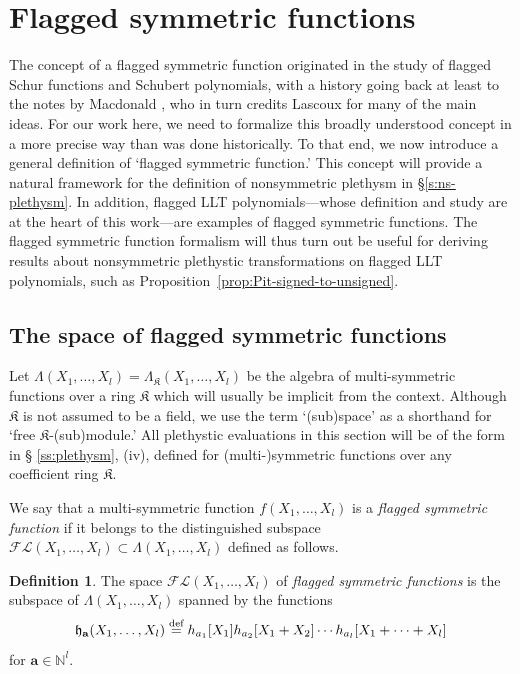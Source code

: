 \documentclass[12pt]{amsart}
\theoremstyle{definition}
\newtheorem{defn}[thm]{Definition}
\theoremstyle{remark}
\newcommand{\multisymmetric}{(multi\mbox{-})symmetric }
\newcommand{\NN}{{\mathbb N}}
\newcommand{\aA}{{\mathbf a}}
\newcommand{\fh}{{\mathfrak h}}
\newcommand{\Kfrak}{{\mathfrak K}}
\newcommand{\FLambda}{\mathcal{F\!L}}
\newcommand{\defeq}{\mathrel{\overset{\text{{\rm def}}}{=}}}
\begin{document}
\section{Flagged symmetric functions}
\label{s:flagged-symmetric-functions}

The concept of a flagged symmetric function originated in the study of
flagged Schur functions and Schubert polynomials, with a history going
back at least to the notes by Macdonald \cite{Macdonald91}, who in
turn credits Lascoux for many of the main ideas.  For our work here,
we need to formalize this broadly understood concept in a more precise
way than was done historically.  To that end, we now introduce a
general definition of `flagged symmetric function.'  This concept will
provide a natural framework for the definition of nonsymmetric
plethysm in \S \ref{s:ns-plethysm}.  In addition, flagged LLT
polynomials---whose definition and study are at the heart of this
work---are examples of flagged symmetric functions.  The flagged
symmetric function formalism will thus turn out be useful for deriving
results about nonsymmetric plethystic transformations on flagged LLT
polynomials, such as Proposition~\ref{prop:Pit-signed-to-unsigned}.


\subsection{The space of flagged symmetric functions}
\label{ss:flagged-sym}

Let $\Lambda (X_{1},\ldots,X_{l}) = \Lambda _{\Kfrak
}(X_{1},\ldots,X_{l}) $ be the algebra of multi-symmetric functions
over a ring $\Kfrak $ which will usually be implicit from the context.
Although $\Kfrak $ is not assumed to be a field, we use the term
`(sub)space' as a shorthand for `free $\Kfrak $-(sub)module.'  All
plethystic evaluations in this section will be of the form in \S
\ref{ss:plethysm}, (iv), defined for \multisymmetric functions over
any coefficient ring $\Kfrak $.


We say that a multi-symmetric function $f(X_{1},\ldots,X_{l})$ is a
{\em flagged symmetric function} if it belongs to the distinguished
subspace $\FLambda (X_{1},\ldots,X_{l}) \subset \Lambda
(X_{1},\ldots,X_{l})$ defined as follows.

\begin{defn}\label{def:flagged-sym}
The space $\FLambda(X_{1},\ldots,X_{l})$ of {\em flagged symmetric
functions} is the subspace of $\Lambda (X_{1},\ldots,X_{l})$ spanned
by the functions
\begin{equation}\label{e:flagged-sym-basis}
{\fh}_{\aA}(X_{1},\ldots,X_{l}) \defeq
h_{a_{1}}[X_{1}]h_{a_{2}}[X_{1}+X_{2}]\cdots h_{a_{l}}[X_{1}+\cdots
+X_{l}]
\end{equation}
for $\aA \in \NN ^{l}$.
\end{defn}
\end{document}
